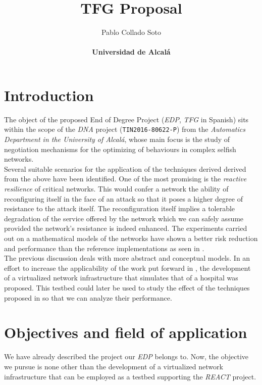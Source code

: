 \documentclass[12pt]{article}
\title{\vspace{-1cm}TFG Proposal}
\author{Pablo Collado Soto \\ \\ \textbf{Universidad de Alcalá}}
\date{}
\begin{document}
    \maketitle

    \section{Introduction}
        The object of the proposed End of Degree Project (\textit{EDP}, \textit{TFG} in Spanish) sits within the scope of the \textit{DNA} project (\texttt{TIN2016-80622-P}) from the \textit{Automatics Department in the University of Alcalá}, whose main focus is the study of negotiation mechanisms for the optimizing of behaviours in complex selfish networks.\\

        Several suitable scenarios for the application of the techniques derived derived from the above have been identified. One of the most promising is the \textit{reactive resilience} of critical networks. This would confer a network the ability of reconfiguring itself in the face of an attack so that it poses a higher degree of resistance to the attack itself. The reconfiguration itself implies a tolerable degradation of the service offered by the network which we can safely assume provided the network's resistance is indeed enhanced. The experiments carried out on a mathematical models of the networks have shown a better risk reduction and performance than the reference implementations as seen in \cite{bib:REACT}.\\

        The previous discussion deals with more abstract and conceptual models. In an effort to increase the applicability of the work put forward in \cite{bib:REACT}, the development of a virtualized network infrastructure that simulates that of a hospital was proposed. This testbed could later be used to study the effect of the techniques proposed in \cite{bib:REACT} so that we can analyze their performance.\\

    \section{Objectives and field of application}
        We have already described the project our \textit{EDP} belongs to. Now, the objective we pursue is none other than the development of a virtualized network infrastructure that can be employed as a testbed supporting the \textit{REACT} project.\\
\end{document}
